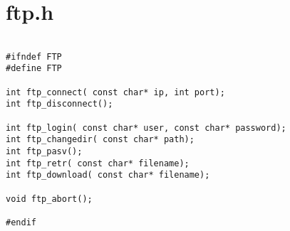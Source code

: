 \section{ftp.h}
\label{FTPH}

\begin{lstlisting}

#ifndef FTP
#define FTP

int ftp_connect( const char* ip, int port);
int ftp_disconnect();

int ftp_login( const char* user, const char* password);
int ftp_changedir( const char* path);
int ftp_pasv();
int ftp_retr( const char* filename);
int ftp_download( const char* filename);

void ftp_abort();

#endif

\end{lstlisting}